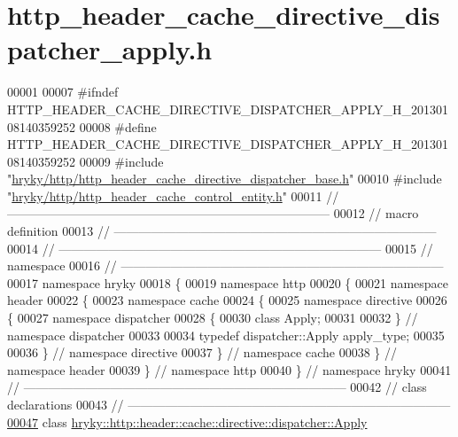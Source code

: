 \hypertarget{http__header__cache__directive__dispatcher__apply_8h_source}{\section{http\-\_\-header\-\_\-cache\-\_\-directive\-\_\-dispatcher\-\_\-apply.\-h}
}

\begin{DoxyCode}
00001 
00007 \textcolor{preprocessor}{#ifndef HTTP\_HEADER\_CACHE\_DIRECTIVE\_DISPATCHER\_APPLY\_H\_20130108140359252}
00008 \textcolor{preprocessor}{}\textcolor{preprocessor}{#define HTTP\_HEADER\_CACHE\_DIRECTIVE\_DISPATCHER\_APPLY\_H\_20130108140359252}
00009 \textcolor{preprocessor}{}\textcolor{preprocessor}{#include "\hyperlink{http__header__cache__directive__dispatcher__base_8h}{hryky/http/http_header_cache_directive_dispatcher_base.h}"}
00010 \textcolor{preprocessor}{#include "\hyperlink{http__header__cache__control__entity_8h}{hryky/http/http_header_cache_control_entity.h}"}
00011 \textcolor{comment}{//
      ------------------------------------------------------------------------------}
00012 \textcolor{comment}{// macro definition}
00013 \textcolor{comment}{//
      ------------------------------------------------------------------------------}
00014 \textcolor{comment}{//
      ------------------------------------------------------------------------------}
00015 \textcolor{comment}{// namespace}
00016 \textcolor{comment}{//
      ------------------------------------------------------------------------------}
00017 \textcolor{keyword}{namespace }hryky
00018 \{
00019 \textcolor{keyword}{namespace }http
00020 \{
00021 \textcolor{keyword}{namespace }header
00022 \{
00023 \textcolor{keyword}{namespace }cache
00024 \{
00025 \textcolor{keyword}{namespace }directive
00026 \{
00027 \textcolor{keyword}{namespace }dispatcher
00028 \{
00030     \textcolor{keyword}{class }Apply;
00031 
00032 \} \textcolor{comment}{// namespace dispatcher}
00033 
00034 \textcolor{keyword}{typedef} dispatcher::Apply apply\_type;
00035 
00036 \} \textcolor{comment}{// namespace directive}
00037 \} \textcolor{comment}{// namespace cache}
00038 \} \textcolor{comment}{// namespace header}
00039 \} \textcolor{comment}{// namespace http}
00040 \} \textcolor{comment}{// namespace hryky}
00041 \textcolor{comment}{//
      ------------------------------------------------------------------------------}
00042 \textcolor{comment}{// class declarations}
00043 \textcolor{comment}{//
      ------------------------------------------------------------------------------}
\hypertarget{http__header__cache__directive__dispatcher__apply_8h_source_l00047}{}\hyperlink{classhryky_1_1http_1_1header_1_1cache_1_1directive_1_1dispatcher_1_1_apply}{00047} \textcolor{comment}{}\textcolor{keyword}{class }\hyperlink{classhryky_1_1http_1_1header_1_1cache_1_1directive_1_1dispatcher_1_1_apply}{hryky::http::header::cache::directive::dispatcher::Apply}

\end{DoxyCode}
